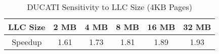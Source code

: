\begin {table}[h]
\vspace{-0.15 in}
\begin{center} 
\caption{\small DUCATI Sensitivity to LLC Size (4KB Pages) }
\begin{tabular}{| c | c | c | c | c | c | }
\hline
 LLC Size   & 2 MB  & 4 MB  & 8 MB  & 16 MB & 32 MB \\ \hline
 Speedup    & 1.61 & 1.73 & 1.81 & 1.89 & 1.93 \\ \hline

\end{tabular}
\label{table:LLC_sens}
\vspace{-0.3in}
\end{center}
\end{table}
